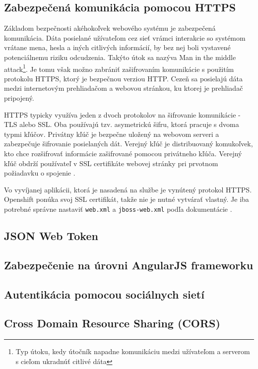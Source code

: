 \documentclass[12pt,oneside]{fithesis2}
\begin{document}
      		\subsection{Zabezpečená komunikácia pomocou HTTPS}
      		\par Základom bezpečnosti akéhokoľvek webového systému je zabezpečená komunikácia. Dáta posielané užívateľom cez sieť vrámci interakcie so systémom vrátane mena, hesla a iných citlivých informácií, by bez nej boli vystavené potenciálnemu riziku odcudzenia. Takýto útok sa nazýva Man in the middle attack\footnote{Typ útoku, kedy útočník napadne komunikáciu medzi užívateľom a serverom s cieľom ukradnúť citlivé dáta}. Je tomu však možno zabrániť zašifrovaním komunikácie s použitím protokolu HTTPS, ktorý je bezpečnou verziou HTTP. Cezeň sa posielajú dáta medzi internetovým prehliadačom a webovou stránkou, ku ktorej je prehliadač pripojený. 
      		\par HTTPS typicky využíva jeden z dvoch protokolov na šifrovanie komunikácie - TLS alebo SSL. Oba používajú tzv. asymetrickú šifru, ktorá pracuje s dvoma typmi kľúčov. Privátny kľúč je bezpečne uložený na webovom serveri a zabezpečuje šifrovanie posielaných dát. Verejný kľúč je distribuovaný komukoľvek, kto chce rozšifrovať informácie zašifrované pomocou privátneho kľúča. Verejný kľúč obdrží používateľ v SSL certifikáte webovej stránky pri prvotnom požiadavku o spojenie \cite{comodo15}.
      		\par Vo vyvíjanej aplikácii, ktorá je nasadená na službe je vynútený protokol HTTPS. Openshift ponúka svoj SSL certifikát, takže nie je nutné vytvárať vlastný. Je iba potrebné správne nastaviť \texttt{web.xml} a \texttt{jboss-web.xml} podľa dokumentácie \cite{openshift15}.
      		\pagebreak

      		\subsection{JSON Web Token}
      		\subsection{Zabezpečenie na úrovni AngularJS frameworku}
      		\subsection{Autentikácia pomocou sociálnych sietí}
      		\subsection{Cross Domain Resource Sharing (CORS)}
\end{document}
